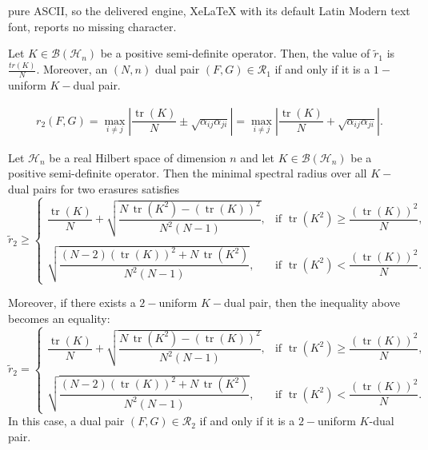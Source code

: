\documentclass[10pt,a4paper]{amsart}
\begin{document}
pure ASCII, so the delivered engine, XeLaTeX with its default Latin Modern text font, reports no missing character.
	\begin{thm} \label{thm5point2}
   Let $K \in \mathcal{B}(\mathcal{H}_n)$ be a positive semi-definite operator. Then, the value of $\tilde{r}_{1} $ is $\frac{tr(K)}{N}.$  Moreover, an $(N,n)$ dual pair $(F,G) \in \mathcal{R}_{1} $ if and only if it is a $1-$uniform $K-$dual pair.
		
	\end{thm}

\begin{align}\label{eqn3point4*}
	r_{2}(F,G) = \max_{i\neq j} \left| \dfrac{\operatorname{tr}(K)}{N} \pm \sqrt{\alpha_{ij}\alpha_{ji}} \right| = \max_{i\neq j} \left| \dfrac{\operatorname{tr}(K)}{N} + \sqrt{\alpha_{ij}\alpha_{ji}} \right|.
\end{align}

	\begin{thm}\label{theorem3point5twoerasure}
Let \( \mathcal{H}_n \) be a real Hilbert space of dimension \( n \) and let \( K \in \mathcal{B}(\mathcal{H}_n) \) be a positive semi-definite operator. Then the minimal spectral radius over all $K-$dual pairs for two erasures satisfies
\[
\tilde{r}_{2} \geq 
\begin{cases}
\dfrac{\operatorname{tr}(K)}{N} + \sqrt{\dfrac{N\,\operatorname{tr}(K^2) - \left(\operatorname{tr}(K)\right)^2}{N^2(N-1)}}, & \text{if } \operatorname{tr}(K^2) \geq \dfrac{\left(\operatorname{tr}(K)\right)^2}{N},\\~\\
\sqrt{\dfrac{(N-2)\left(\operatorname{tr}(K)\right)^2 + N\,\operatorname{tr}(K^2)}{N^2(N-1)}}, & \text{if } \operatorname{tr}(K^2) < \dfrac{\left(\operatorname{tr}(K)\right)^2}{N}.
\end{cases}
\]

Moreover, if there exists a  $2-$uniform \( K-\)dual pair, then the inequality above becomes an equality:
\begin{equation}\label{equation7expression}
\tilde{r}_{2} = 
\begin{cases}
\dfrac{\operatorname{tr}(K)}{N} + \sqrt{\dfrac{N\,\operatorname{tr}(K^2) - \left(\operatorname{tr}(K)\right)^2}{N^2(N-1)}}, & \text{if } \operatorname{tr}(K^2) \geq \dfrac{\left(\operatorname{tr}(K)\right)^2}{N},\\~\\
\sqrt{\dfrac{(N-2)\left(\operatorname{tr}(K)\right)^2 + N\,\operatorname{tr}(K^2)}{N^2(N-1)}}, & \text{if } \operatorname{tr}(K^2) < \dfrac{\left(\operatorname{tr}(K)\right)^2}{N}.
\end{cases}
\end{equation}
In this case, a dual pair \( (F, G) \in \mathcal{R}_2 \) if and only if it is a  $2-$uniform \( K \)-dual pair.
\end{thm}
\end{document}
